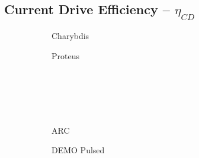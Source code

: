 \clearpage

\newpage

\subsection*{ Current Drive Efficiency -- $\eta_{CD}$ }
  \label{subsection:scan_eta_CD}

\begin{figure*}[h!]
    \centering
    \hfill
    \begin{subfigure}[t]{0.45\textwidth}
        \centering
    \begin{adjustbox}{width=\textwidth}
      \Large
      
    \end{adjustbox}
        \caption{Charybdis}
    \end{subfigure}
    \hfill
    \begin{subfigure}[t]{0.45\textwidth}
        \centering
    \begin{adjustbox}{width=\textwidth}
      \Large
      
    \end{adjustbox}
        \caption{Proteus}
    \end{subfigure}
    \hfill \hfill ~\\ ~\\ ~\\ ~\\
    \hfill
    \begin{subfigure}[t]{0.45\textwidth}
        \centering
    \begin{adjustbox}{width=\textwidth}
      \Large
      
    \end{adjustbox}
        \caption{ARC}
    \end{subfigure}
    \hfill
    \begin{subfigure}[t]{0.45\textwidth}
        \centering
    \begin{adjustbox}{width=\textwidth}
      \Large
      
    \end{adjustbox}
        \caption{DEMO Pulsed}
    \end{subfigure}
    \hfill \hfill ~\\ ~\\ ~\\ ~\\
    \hfill
    \begin{subfigure}[t]{0.45\textwidth}
        \centering
    \begin{adjustbox}{width=\textwidth}

\end{adjustbox}
\end{subfigure}
\end{figure*}
